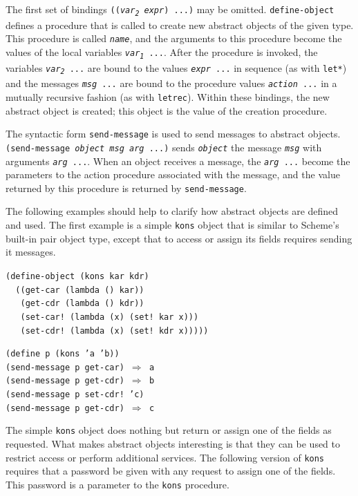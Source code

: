 The first set of bindings \texttt{((\textit{var\textsubscript{2}} \textit{expr}) ...)} may be
omitted.
\texttt{define-object} defines a procedure that is called to create new
abstract objects of the given type.
This procedure is called \texttt{\textit{name}}, and the arguments to
this procedure become the values of the local variables
\texttt{\textit{var\textsubscript{1}} ...}.
After the procedure is invoked, the variables \texttt{\textit{var\textsubscript{2}} ...} are
bound to the values \texttt{\textit{expr} ...} in sequence (as with \texttt{let*})
and the messages \texttt{\textit{msg} ...} are bound to the procedure values
\texttt{\textit{action} ...} in a mutually recursive fashion (as with \texttt{letrec}).
Within these bindings, the new abstract object is created; this object
is the value of the creation procedure.


The syntactic form \texttt{send-message} is used to send messages to
abstract objects.
\texttt{(send-message \textit{object} \textit{msg} \textit{arg} ...)} sends
\texttt{\textit{object}} the message \texttt{\textit{msg}} with arguments \texttt{\textit{arg} ...}.
When an object receives a message, the \texttt{\textit{arg} ...} become the
parameters to the action procedure associated with the message, and
the value returned by this procedure is returned by \texttt{send-message}.


The following examples should help to clarify how abstract objects are
defined and used.
The first example is a simple \texttt{kons} object that is similar to
Scheme's built-in pair object type, except that to access or assign
its fields requires sending it messages.


\begin{alltt}
(define-object (kons kar kdr)
  ((get-car (lambda () kar))
   (get-cdr (lambda () kdr))
   (set-car! (lambda (x) (set! kar x)))
   (set-cdr! (lambda (x) (set! kdr x)))))

(define p (kons 'a 'b))
(send-message p get-car) \(\Rightarrow\) a
(send-message p get-cdr) \(\Rightarrow\) b
(send-message p set-cdr! 'c)
(send-message p get-cdr) \(\Rightarrow\) c
\end{alltt}


The simple \texttt{kons} object does nothing but return or assign one of
the fields as requested.
What makes abstract objects interesting is that they can be used to
restrict access or perform additional services.
The following version of \texttt{kons} requires that a password be given
with any request to assign one of the fields.
This password is a parameter to the \texttt{kons} procedure.


